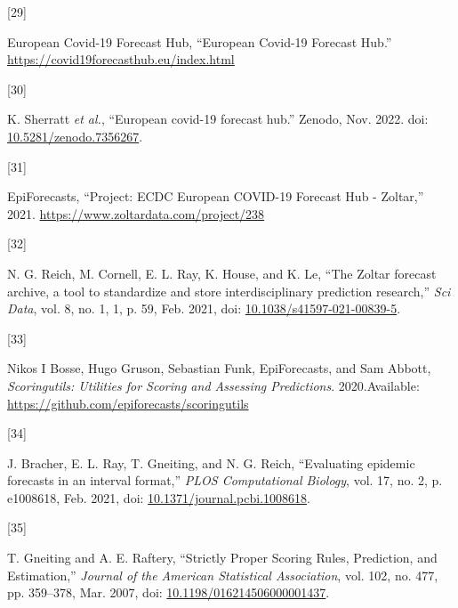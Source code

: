 \documentclass[
]{article}
\newlength{\cslhangindent}
\newlength{\csllabelwidth}
\newlength{\cslentryspacingunit} %
\newenvironment{CSLReferences}[2] %
 {%
  \setlength{\parindent}{0pt}
  \ifodd #1
  \let\oldpar\par
  \def\par{\hangindent=\cslhangindent\oldpar}
  \fi
  \setlength{\parskip}{#2\cslentryspacingunit}
 }%
 {}
\newcommand{\CSLLeftMargin}[1]{\parbox[t]{\csllabelwidth}{#1}}
\newcommand{\CSLRightInline}[1]{\parbox[t]{\linewidth - \csllabelwidth}{#1}\break}
\begin{document}
\begin{CSLReferences}{0}{0}
\leavevmode{}%
\CSLLeftMargin{{[}29{]} }
\CSLRightInline{European Covid-19 Forecast Hub, {``European {Covid-19 Forecast Hub}.''} \url{https://covid19forecasthub.eu/index.html}}

\leavevmode{}%
\CSLLeftMargin{{[}30{]} }
\CSLRightInline{K. Sherratt \emph{et al.}, {``European covid-19 forecast hub.''} Zenodo, Nov. 2022. doi: \href{https://doi.org/10.5281/zenodo.7356267}{10.5281/zenodo.7356267}.}

\leavevmode{}%
\CSLLeftMargin{{[}31{]} }
\CSLRightInline{EpiForecasts, {``Project: {ECDC European COVID-19 Forecast Hub} - {Zoltar},''} 2021. \url{https://www.zoltardata.com/project/238}}

\leavevmode{}%
\CSLLeftMargin{{[}32{]} }
\CSLRightInline{N. G. Reich, M. Cornell, E. L. Ray, K. House, and K. Le, {``The {Zoltar} forecast archive, a tool to standardize and store interdisciplinary prediction research,''} \emph{Sci Data}, vol. 8, no. 1, 1, p. 59, Feb. 2021, doi: \href{https://doi.org/10.1038/s41597-021-00839-5}{10.1038/s41597-021-00839-5}.}

\leavevmode{}%
\CSLLeftMargin{{[}33{]} }
\CSLRightInline{Nikos I Bosse, Hugo Gruson, Sebastian Funk, EpiForecasts, and Sam Abbott, \emph{Scoringutils: {Utilities} for {Scoring} and {Assessing Predictions}}. 2020.Available: \url{https://github.com/epiforecasts/scoringutils}}

\leavevmode{}%
\CSLLeftMargin{{[}34{]} }
\CSLRightInline{J. Bracher, E. L. Ray, T. Gneiting, and N. G. Reich, {``Evaluating epidemic forecasts in an interval format,''} \emph{PLOS Computational Biology}, vol. 17, no. 2, p. e1008618, Feb. 2021, doi: \href{https://doi.org/10.1371/journal.pcbi.1008618}{10.1371/journal.pcbi.1008618}.}

\leavevmode{}%
\CSLLeftMargin{{[}35{]} }
\CSLRightInline{T. Gneiting and A. E. Raftery, {``Strictly {Proper Scoring Rules}, {Prediction}, and {Estimation},''} \emph{Journal of the American Statistical Association}, vol. 102, no. 477, pp. 359--378, Mar. 2007, doi: \href{https://doi.org/10.1198/016214506000001437}{10.1198/016214506000001437}.}


\end{CSLReferences}
\end{document}
